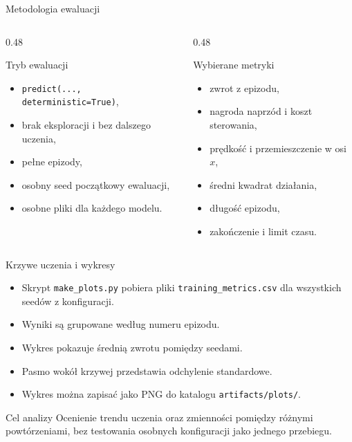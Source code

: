 \documentclass[aspectratio=169,11pt]{beamer}
\begin{document}
\begin{frame}{Metodologia ewaluacji}
  \begin{columns}[T,onlytextwidth]
    \begin{column}{0.48\textwidth}
      \begin{block}{Tryb ewaluacji}
        \begin{itemize}
          \item \texttt{predict(..., deterministic=True)},
          \item brak eksploracji i bez dalszego uczenia,
          \item pełne epizody,
          \item osobny seed początkowy ewaluacji,
          \item osobne pliki dla każdego modelu.
        \end{itemize}
      \end{block}
    \end{column}
    \begin{column}{0.48\textwidth}
      \begin{block}{Wybierane metryki}
        \begin{itemize}
          \item zwrot z epizodu,
          \item nagroda naprzód i koszt sterowania,
          \item prędkość i przemieszczenie w osi $x$,
          \item średni kwadrat działania,
          \item długość epizodu,
          \item zakończenie i limit czasu.
        \end{itemize}
      \end{block}
    \end{column}
  \end{columns}
\end{frame}

\begin{frame}{Krzywe uczenia i wykresy}
  \begin{itemize}
    \item Skrypt \texttt{make\_plots.py} pobiera pliki
    \texttt{training\_metrics.csv} dla wszystkich seedów z konfiguracji.
    \item Wyniki są grupowane według numeru epizodu.
    \item Wykres pokazuje średnią zwrotu pomiędzy seedami.
    \item Pasmo wokół krzywej przedstawia odchylenie standardowe.
    \item Wykres można zapisać jako PNG do katalogu \texttt{artifacts/plots/}.
  \end{itemize}

  \vspace{0.7em}
  \begin{block}{Cel analizy}
    Ocenienie trendu uczenia oraz zmienności pomiędzy różnymi powtórzeniami,
    bez testowania osobnych konfiguracji jako jednego przebiegu.
  \end{block}
\end{frame}
\end{document}

